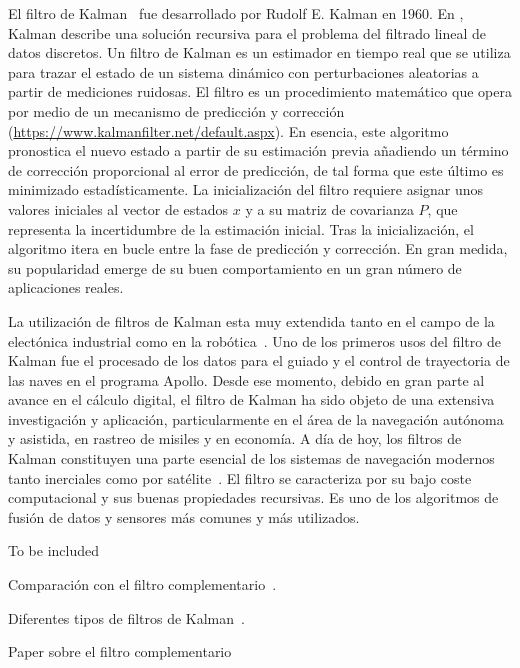 \documentclass[a4paper,12pt]{book}
\begin{document}
El filtro de Kalman~\cite{chui2017kalman} fue desarrollado por Rudolf E. Kalman en 1960. En \cite{kalman1960new}, Kalman describe una solución recursiva para el problema del filtrado lineal de datos discretos. Un filtro de Kalman es un estimador en tiempo real que se utiliza para trazar el estado de un sistema dinámico con perturbaciones aleatorias a partir de mediciones ruidosas. El filtro es un procedimiento matemático que opera por medio de un mecanismo de predicción y corrección (\url{https://www.kalmanfilter.net/default.aspx}). En esencia, este algoritmo pronostica el nuevo estado a partir de su estimación previa añadiendo un término de corrección proporcional al error de predicción, de tal forma que este último es minimizado estadísticamente. La inicialización del filtro requiere asignar unos valores iniciales al vector de estados $x$ y a su matriz de covarianza $P$, que representa la incertidumbre de la estimación inicial. Tras la inicialización, el algoritmo itera en bucle entre la fase de predicción y corrección. En gran medida, su popularidad emerge de su buen comportamiento en un gran número de aplicaciones reales.

La utilización de filtros de Kalman esta muy extendida tanto en el campo de la electónica industrial como en la robótica~\cite{auger2013industrial, chen2011kalman}. Uno de los primeros usos del filtro de Kalman fue el procesado de los datos para  el guiado y el control de trayectoria de las naves en el programa Apollo. Desde ese momento, debido en gran parte al avance en el cálculo digital, el filtro de Kalman ha sido objeto de una extensiva investigación y aplicación, particularmente en el área de la navegación autónoma y asistida, en rastreo de misiles y en economía.  A día de hoy, los filtros de Kalman constituyen una parte esencial de los sistemas de navegación modernos tanto inerciales como por satélite~\cite{grewal2020kalman, grewal2014kalman}. El filtro se caracteriza por su bajo coste computacional y sus buenas propiedades recursivas. Es uno de los algoritmos de fusión de datos y sensores más comunes y más utilizados. 



{\color{red}To be included

Comparación con el filtro complementario~\cite{higgins1975comparison, gui2015mems}.

Diferentes tipos de filtros de Kalman~\cite{emer2020survey}.

Paper sobre el filtro complementario~\cite{euston2008complementary}

}
\end{document}

